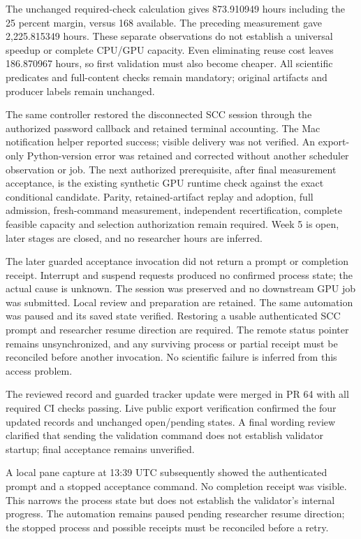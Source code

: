 The unchanged required-check calculation gives 873.910949 hours including the
25 percent margin, versus 168 available. The preceding measurement gave
2,225.815349 hours. These separate observations do not establish a universal
speedup or complete CPU/GPU capacity. Even eliminating reuse cost leaves
186.870967 hours, so first validation must also become cheaper. All scientific
predicates and full-content checks remain mandatory; original artifacts and
producer labels remain unchanged.

The same controller restored the disconnected SCC session through the authorized
password callback and retained terminal accounting. The Mac notification helper
reported success; visible delivery was not verified. An export-only Python-version
error was retained and corrected without another scheduler observation or job.
The next authorized prerequisite, after final measurement acceptance, is the
existing synthetic GPU runtime check against the exact conditional candidate. Parity, retained-artifact replay and
adoption, full admission, fresh-command measurement, independent recertification,
complete feasible capacity and selection authorization remain required. Week 5
is open, later stages are closed, and no researcher hours are inferred.

The later guarded acceptance invocation did not return a prompt or completion
receipt. Interrupt and suspend requests produced no confirmed process state;
the actual cause is unknown. The session was preserved and no downstream GPU
job was submitted. Local review and preparation are retained. The same automation
was paused and its saved state verified. Restoring a usable authenticated SCC
prompt and researcher resume direction are required. The remote status pointer
remains unsynchronized, and any surviving process or partial receipt must be
reconciled before another invocation. No scientific failure is inferred from
this access problem.

The reviewed record and guarded tracker update were merged in PR 64 with all
required CI checks passing. Live public export verification confirmed the four
updated records and unchanged open/pending states. A final wording review
clarified that sending the validation command does not establish validator
startup; final acceptance remains unverified.

A local pane capture at 13:39 UTC subsequently showed the authenticated prompt
and a stopped acceptance command. No completion receipt was visible. This
narrows the process state but does not establish the validator's internal
progress. The automation remains paused pending researcher resume direction;
the stopped process and possible receipts must be reconciled before a retry.

